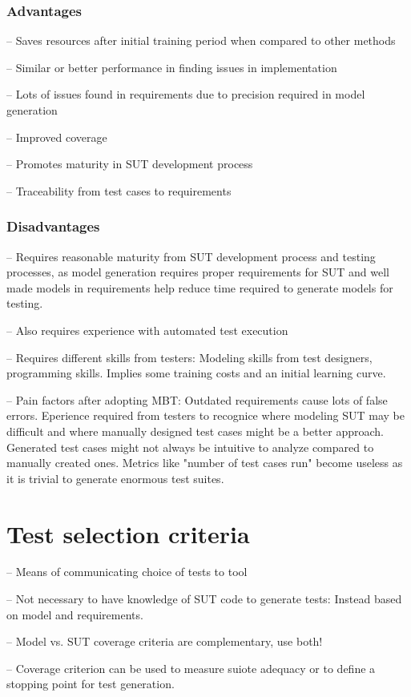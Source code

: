 \subsubsection{Advantages}
-- Saves resources after initial training period when compared to other methods

-- Similar or better performance in finding issues in implementation

-- Lots of issues found in requirements due to precision required in model generation

-- Improved coverage

-- Promotes maturity in SUT development process

-- Traceability from test cases to requirements

\subsubsection{Disadvantages}
-- Requires reasonable maturity from SUT development process and testing processes, as model generation requires proper requirements for SUT and well made models in requirements help reduce time required to generate models for testing.

-- Also requires experience with automated test execution

-- Requires different skills from testers: Modeling skills from test designers, programming skills. Implies some training costs and an initial learning curve.

-- Pain factors after adopting MBT: Outdated requirements cause lots of false errors. Eperience required from testers to recognice where modeling SUT may be difficult and where manually designed test cases might be a better approach. Generated test cases might not always be intuitive to analyze compared to manually created ones. Metrics like "number of test cases run" become useless as it is trivial to generate enormous test suites.

\section{Test selection criteria}
-- Means of communicating choice of tests to tool

-- Not necessary to have knowledge of SUT code to generate tests: Instead based on model and requirements.

-- Model vs. SUT coverage criteria are complementary, use both!

-- Coverage criterion can be used to measure suiote adequacy or to define a stopping point for test generation.

